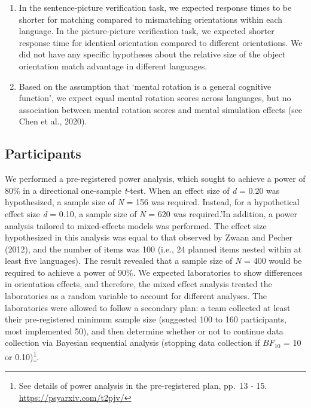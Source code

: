 \documentclass[
  man,floatsintext]{apa7}
\begin{document}
\begin{enumerate}
\def\labelenumi{(\arabic{enumi})}
\item
  In the sentence-picture verification task, we expected response
  times to be shorter for matching compared to mismatching
  orientations within each language. In the picture-picture
  verification task, we expected shorter response time for identical
  orientation compared to different orientations. We did not have any
  specific hypotheses about the relative size of the object
  orientation match advantage in different languages.
\item
  Based on the assumption that `mental rotation is a general cognitive
  function', we expect equal mental rotation scores across languages,
  but no association between mental rotation scores and mental
  simulation effects (see Chen et al., 2020).
\end{enumerate}

\hypertarget{participants}{%
\subsection{Participants}\label{participants}}

We performed a pre-registered power analysis, which sought to achieve a
power of 80\% in a directional one-sample \emph{t}-test. When an effect size
of \emph{d} = 0.20 was hypothesized, a sample size of \emph{N} = 156 was required.
Instead, for a hypothetical effect size \emph{d} = 0.10, a sample size of \emph{N}
= 620 was required.'In addition, a power analysis tailored to
mixed-effects models was performed. The effect size hypothesized in this
analysis was equal to that observed by
Zwaan and Pecher (2012), and the number of items was 100
(i.e., 24 planned items nested within at least five languages). The
result revealed that a sample size of \emph{N} = 400 would be required to
achieve a power of 90\%. We expected laboratories to show differences in
orientation effects, and therefore, the mixed effect analysis treated
the laboratories as a random variable to account for different analyses.
The laboratories were allowed to follow a secondary plan: a team
collected at least their pre-registered minimum sample size (suggested
100 to 160 participants, most implemented 50), and then determine
whether or not to continue data collection via Bayesian sequential
analysis (stopping data collection if \(BF_{10}\) = 10 or 0.10)\footnote{See details of power analysis in the pre-registered plan, pp.~13 -
  15. \url{https://psyarxiv.com/t2pjv/}}.
\end{document}
